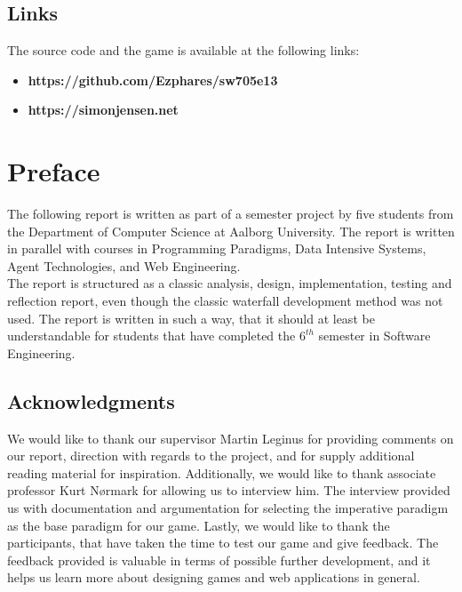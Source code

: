 \section*{Links}
The source code and the game is available at the following links:

\begin{itemize}
\item \textbf{https://github.com/Ezphares/sw705e13}
\item \textbf{https://simonjensen.net}
\end{itemize}
\newpage

\chapter*{Preface}

The following report is written as part of a semester project by five students from the Department of Computer Science at Aalborg University.
The report is written in parallel with courses in Programming Paradigms, Data Intensive Systems, Agent Technologies, and Web Engineering.
\\

The report is structured as a classic analysis, design, implementation, testing and reflection report, even though the classic waterfall development method was not used.
The report is written in such a way, that it should at least be understandable for students that have completed the $6^{th}$ semester in Software Engineering.

\section*{Acknowledgments}

We would like to thank our supervisor Martin Leginus for providing comments on our report, direction with regards to the project, and for supply additional reading material for inspiration.
Additionally, we would like to thank associate professor Kurt N{\o}rmark for allowing us to interview him.
The interview provided us with documentation and argumentation for selecting the imperative paradigm as the base paradigm for our game.
Lastly, we would like to thank the participants, that have taken the time to test our game and give feedback.
The feedback provided is valuable in terms of possible further development, and it helps us learn more about designing games and web applications in general.